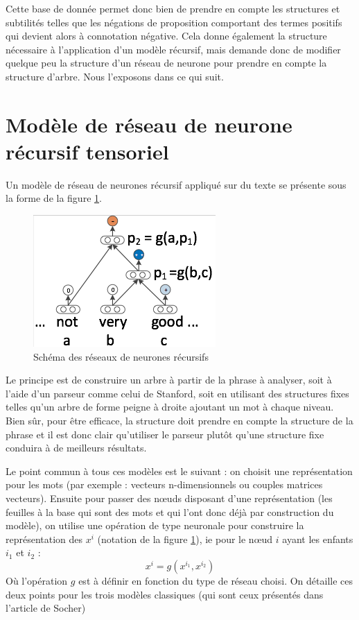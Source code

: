 \documentclass[conference]{IEEEtran}
\begin{document}
Cette base de donnée permet donc bien de prendre en compte les structures et subtilités telles que les négations de proposition comportant des termes positifs qui devient alors à connotation négative. Cela donne également la structure nécessaire à l'application d'un modèle récursif, mais demande donc de modifier quelque peu la structure d'un réseau de neurone pour prendre en compte la structure d'arbre. Nous l'exposons dans ce qui suit.

\section{Modèle de réseau de neurone récursif tensoriel}

Un modèle de réseau de neurones récursif appliqué sur du texte se présente sous la forme de la figure \ref{RNN}.

\begin{figure}
\centering
\includegraphics[width=0.75\columnwidth]{fig/RNN.png}
\caption{Schéma des réseaux de neurones récursifs}
\label{RNN}
\end{figure}

Le principe est de construire un arbre à partir de la phrase à analyser, soit à l'aide d'un parseur comme celui de Stanford, soit en utilisant des structures fixes telles qu'un arbre de forme peigne à droite ajoutant un mot à chaque niveau. Bien sûr, pour être efficace, la structure doit prendre en compte la structure de la phrase et il est donc clair qu'utiliser le parseur plutôt qu'une structure fixe conduira à de meilleurs résultats.

Le point commun à tous ces modèles est le suivant : on choisit une représentation pour les mots (par exemple : vecteurs n-dimensionnels ou couples matrices vecteurs). Ensuite pour passer des nœuds disposant d'une représentation (les feuilles à la base qui sont des mots et qui l'ont donc déjà par construction du modèle), on utilise une opération de type neuronale pour construire la représentation des $x^i$ (notation de la figure \ref{RNN}), ie pour le nœud $i$ ayant les enfants $i_1$ et $i_2$ :
$$x^i=g(x^{i_1},x^{i_2})$$
Où l'opération $g$ est à définir en fonction du type de réseau choisi. On détaille ces deux points pour les trois modèles classiques (qui sont ceux présentés dans l'article de Socher)
\end{document}
